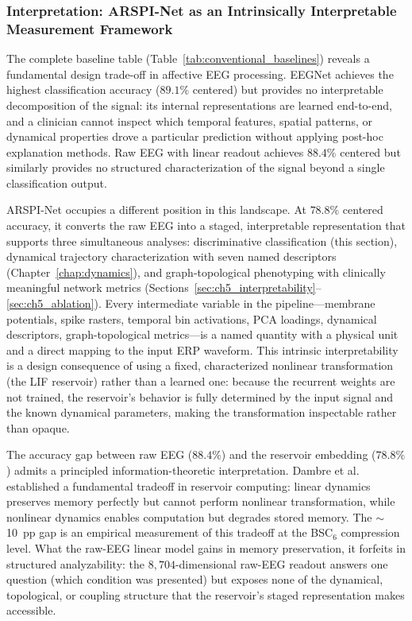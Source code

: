 \subsubsection{Interpretation: ARSPI-Net as an Intrinsically Interpretable Measurement Framework}

The complete baseline table (Table~\ref{tab:conventional_baselines}) reveals a fundamental design trade-off in affective EEG processing. EEGNet achieves the highest classification accuracy ($89.1\%$ centered) but provides no interpretable decomposition of the signal: its internal representations are learned end-to-end, and a clinician cannot inspect which temporal features, spatial patterns, or dynamical properties drove a particular prediction without applying post-hoc explanation methods. Raw EEG with linear readout achieves $88.4\%$ centered but similarly provides no structured characterization of the signal beyond a single classification output.

ARSPI-Net occupies a different position in this landscape. At $78.8\%$ centered accuracy, it converts the raw EEG into a staged, interpretable representation that supports three simultaneous analyses: discriminative classification (this section), dynamical trajectory characterization with seven named descriptors (Chapter~\ref{chap:dynamics}), and graph-topological phenotyping with clinically meaningful network metrics (Sections~\ref{sec:ch5_interpretability}--\ref{sec:ch5_ablation}). Every intermediate variable in the pipeline---membrane potentials, spike rasters, temporal bin activations, PCA loadings, dynamical descriptors, graph-topological metrics---is a named quantity with a physical unit and a direct mapping to the input ERP waveform. This intrinsic interpretability is a design consequence of using a fixed, characterized nonlinear transformation (the LIF reservoir) rather than a learned one: because the recurrent weights are not trained, the reservoir's behavior is fully determined by the input signal and the known dynamical parameters, making the transformation inspectable rather than opaque.

The accuracy gap between raw EEG ($88.4\%$) and the reservoir embedding ($78.8\%$) admits a principled information-theoretic interpretation. Dambre et al.\ \cite{Dambre2012InformationProcessing} established a fundamental tradeoff in reservoir computing: linear dynamics preserves memory perfectly but cannot perform nonlinear transformation, while nonlinear dynamics enables computation but degrades stored memory. The $\sim$10~pp gap is an empirical measurement of this tradeoff at the BSC$_6$ compression level. What the raw-EEG linear model gains in memory preservation, it forfeits in structured analyzability: the $8{,}704$-dimensional raw-EEG readout answers one question (which condition was presented) but exposes none of the dynamical, topological, or coupling structure that the reservoir's staged representation makes accessible.


